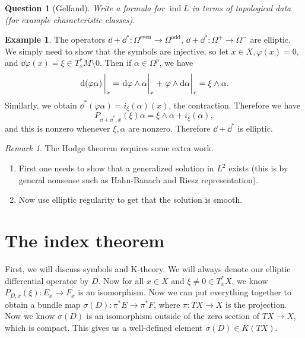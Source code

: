 \documentclass[leqno, openany]{memoir}
\newtheorem{quest}[thm]{Question}
\theoremstyle{definition}
\newtheorem{exm}[thm]{Example}
\theoremstyle{remark}
\newtheorem{rmk}[thm]{Remark}
\theoremstyle{plain}
\theoremstyle{definition}
\theoremstyle{remark}
\DeclareMathOperator{\ind}{ind}
\begin{document}
\begin{quest}[Gelfand]
    Write a formula for $\ind L$ in terms of topological data (for example characteristic classes).
\end{quest}

\begin{exm}
    The operators $\dd + \dd^* \colon \Omega^{\text{even}} \to \Omega^{\text{odd}}$, $\dd + \dd^* \colon \Omega^+ \to \Omega^-$ are elliptic. We simply need to show that the symbols are injective, so let $x \in X, \varphi(x) = 0$, and $\dd \varphi(x) = \xi \in T_x^* M \setminus \qty{0}$. Then if $\alpha \in \Omega^p$, we have
    \[ \eval{\dd{(\varphi \alpha)}}_x = \eval{\dd \varphi \wedge \alpha}_x + \eval{\varphi \wedge \dd \alpha}_x = \xi \wedge \alpha. \]
    Similarly, we obtain $\dd^*(\varphi \alpha) = i_{\xi}(\alpha) (x)$, the contraction. Therefore we have
    \[ P_{\dd + \dd^*, x}(\xi) \alpha = \xi \wedge \alpha + i_{\xi}(\alpha), \]
    and this is nonzero whenever $\xi, \alpha$ are nonzero. Therefore $\dd + \dd^*$ is elliptic.
\end{exm}

\begin{rmk}
    The Hodge theorem requires some extra work. 
    \begin{enumerate}
        \item First one needs to show that a generalized solution in $L^2$ exists (this is by general nonsense such as Hahn-Banach and Riesz representation).
        \item Now use elliptic regularity to get that the solution is smooth.
    \end{enumerate}
\end{rmk}

\section{The index theorem}%
\label{sec:the_index_theorem}

First, we will discuss symbols and K-theory. We will always denote our elliptic differential operator by $D$. Now for all $x \in X$ and $\xi \neq 0 \in T_x^* X$, we know $P_{D,x}(\xi) \colon E_x \to F_x$ is an isomorphism. Now we can put everything together to obtain a bundle map $\sigma(D) \colon \pi^* E \to \pi^* F$, where $\pi \colon TX \to X$ is the projection. Now we know $\sigma(D)$ is an isomorphism outside of the zero section of $TX \to X$, which is compact. This gives us a well-defined element $\sigma(D) \in K(TX)$.
\end{document}

